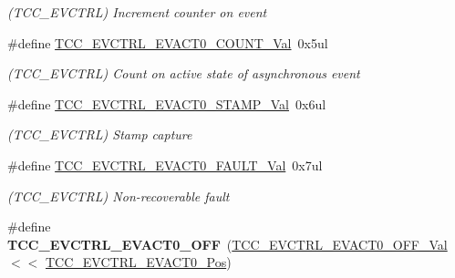 \begin{DoxyCompactItemize}
\begin{DoxyCompactList}\small\item\em (T\+C\+C\+\_\+\+E\+V\+C\+T\+R\+L) Increment counter on event \end{DoxyCompactList}\item 
\hypertarget{group___s_a_m_l21___t_c_c_ga583a6f52e05818d2792e70a607432cc6}{}\#define \hyperlink{group___s_a_m_l21___t_c_c_ga583a6f52e05818d2792e70a607432cc6}{T\+C\+C\+\_\+\+E\+V\+C\+T\+R\+L\+\_\+\+E\+V\+A\+C\+T0\+\_\+\+C\+O\+U\+N\+T\+\_\+\+Val}~0x5ul\label{group___s_a_m_l21___t_c_c_ga583a6f52e05818d2792e70a607432cc6}

\begin{DoxyCompactList}\small\item\em (T\+C\+C\+\_\+\+E\+V\+C\+T\+R\+L) Count on active state of asynchronous event \end{DoxyCompactList}\item 
\hypertarget{group___s_a_m_l21___t_c_c_ga69e3329e1956b2a040fe1243d3399d7a}{}\#define \hyperlink{group___s_a_m_l21___t_c_c_ga69e3329e1956b2a040fe1243d3399d7a}{T\+C\+C\+\_\+\+E\+V\+C\+T\+R\+L\+\_\+\+E\+V\+A\+C\+T0\+\_\+\+S\+T\+A\+M\+P\+\_\+\+Val}~0x6ul\label{group___s_a_m_l21___t_c_c_ga69e3329e1956b2a040fe1243d3399d7a}

\begin{DoxyCompactList}\small\item\em (T\+C\+C\+\_\+\+E\+V\+C\+T\+R\+L) Stamp capture \end{DoxyCompactList}\item 
\hypertarget{group___s_a_m_l21___t_c_c_ga3dd28317ca3247349e572fa966ece270}{}\#define \hyperlink{group___s_a_m_l21___t_c_c_ga3dd28317ca3247349e572fa966ece270}{T\+C\+C\+\_\+\+E\+V\+C\+T\+R\+L\+\_\+\+E\+V\+A\+C\+T0\+\_\+\+F\+A\+U\+L\+T\+\_\+\+Val}~0x7ul\label{group___s_a_m_l21___t_c_c_ga3dd28317ca3247349e572fa966ece270}

\begin{DoxyCompactList}\small\item\em (T\+C\+C\+\_\+\+E\+V\+C\+T\+R\+L) Non-\/recoverable fault \end{DoxyCompactList}\item 
\hypertarget{group___s_a_m_l21___t_c_c_ga18f471ee0bb774b59a29c58580fd2bd4}{}\#define {\bfseries T\+C\+C\+\_\+\+E\+V\+C\+T\+R\+L\+\_\+\+E\+V\+A\+C\+T0\+\_\+\+O\+F\+F}~(\hyperlink{group___s_a_m_l21___t_c_c_ga3ba8b3dc891abf550f7eb01b234ef5c6}{T\+C\+C\+\_\+\+E\+V\+C\+T\+R\+L\+\_\+\+E\+V\+A\+C\+T0\+\_\+\+O\+F\+F\+\_\+\+Val}     $<$$<$ \hyperlink{group___s_a_m_l21___t_c_c_gaa3e2449eae58d3ef88f4cf52816c4c20}{T\+C\+C\+\_\+\+E\+V\+C\+T\+R\+L\+\_\+\+E\+V\+A\+C\+T0\+\_\+\+Pos})\label{group___s_a_m_l21___t_c_c_ga18f471ee0bb774b59a29c58580fd2bd4}


\end{DoxyCompactItemize}
